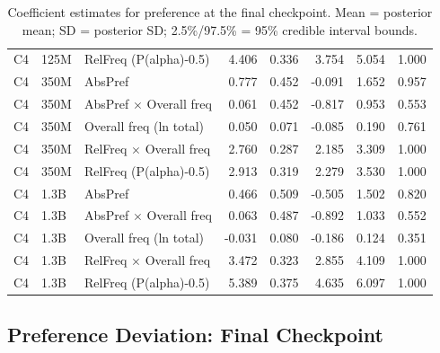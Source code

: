 \documentclass{article}
\begin{document}
\begin{table}[H]
{\begin{tabular}{lllrrrrr}
C4 & 125M & RelFreq (P(alpha)-0.5) & 4.406 & 0.336 & 3.754 & 5.054 & 1.000\\
\addlinespace
C4 & 350M & AbsPref & 0.777 & 0.452 & -0.091 & 1.652 & 0.957\\
C4 & 350M & AbsPref $\times$ Overall freq & 0.061 & 0.452 & -0.817 & 0.953 & 0.553\\
C4 & 350M & Overall freq (ln total) & 0.050 & 0.071 & -0.085 & 0.190 & 0.761\\
C4 & 350M & RelFreq $\times$ Overall freq & 2.760 & 0.287 & 2.185 & 3.309 & 1.000\\
C4 & 350M & RelFreq (P(alpha)-0.5) & 2.913 & 0.319 & 2.279 & 3.530 & 1.000\\
\addlinespace
C4 & 1.3B & AbsPref & 0.466 & 0.509 & -0.505 & 1.502 & 0.820\\
C4 & 1.3B & AbsPref $\times$ Overall freq & 0.063 & 0.487 & -0.892 & 1.033 & 0.552\\
C4 & 1.3B & Overall freq (ln total) & -0.031 & 0.080 & -0.186 & 0.124 & 0.351\\
C4 & 1.3B & RelFreq $\times$ Overall freq & 3.472 & 0.323 & 2.855 & 4.109 & 1.000\\
C4 & 1.3B & RelFreq (P(alpha)-0.5) & 5.389 & 0.375 & 4.635 & 6.097 & 1.000\\
\bottomrule
\end{tabular}

}

\caption{\label{tbl-pref-final}Coefficient estimates for preference at
the final checkpoint. Mean = posterior mean; SD = posterior SD;
2.5\%/97.5\% = 95\% credible interval bounds.}

\end{table}%

\clearpage

\subsection{Preference Deviation: Final
Checkpoint}\label{preference-deviation-final-checkpoint}
\end{document}
